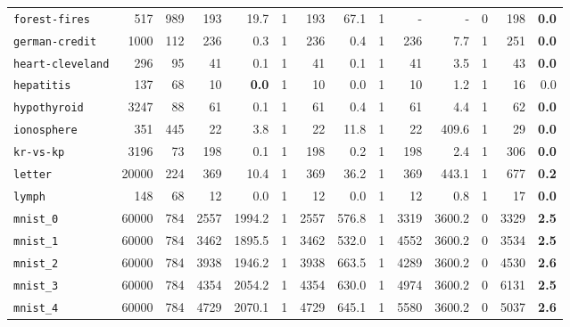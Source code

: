 \begin{tabular}{lccrrrrrrrrrrr}
\texttt{forest-fires} & \multicolumn{1}{r}{517} & \multicolumn{1}{r}{989}  & 193 & 19.7 & 1 & 193 & 67.1 & 1 & - & - & 0 & 198 & \textbf{0.0}\\
\texttt{german-credit} & \multicolumn{1}{r}{1000} & \multicolumn{1}{r}{112}  & 236 & 0.3 & 1 & 236 & 0.4 & 1 & 236 & 7.7 & 1 & 251 & \textbf{0.0}\\
\texttt{heart-cleveland} & \multicolumn{1}{r}{296} & \multicolumn{1}{r}{95}  & 41 & 0.1 & 1 & 41 & 0.1 & 1 & 41 & 3.5 & 1 & 43 & \textbf{0.0}\\
\texttt{hepatitis} & \multicolumn{1}{r}{137} & \multicolumn{1}{r}{68}  & 10 & \textbf{0.0} & 1 & 10 & 0.0 & 1 & 10 & 1.2 & 1 & 16 & 0.0\\
\texttt{hypothyroid} & \multicolumn{1}{r}{3247} & \multicolumn{1}{r}{88}  & 61 & 0.1 & 1 & 61 & 0.4 & 1 & 61 & 4.4 & 1 & 62 & \textbf{0.0}\\
\texttt{ionosphere} & \multicolumn{1}{r}{351} & \multicolumn{1}{r}{445}  & 22 & 3.8 & 1 & 22 & 11.8 & 1 & 22 & 409.6 & 1 & 29 & \textbf{0.0}\\
\texttt{kr-vs-kp} & \multicolumn{1}{r}{3196} & \multicolumn{1}{r}{73}  & 198 & 0.1 & 1 & 198 & 0.2 & 1 & 198 & 2.4 & 1 & 306 & \textbf{0.0}\\
\texttt{letter} & \multicolumn{1}{r}{20000} & \multicolumn{1}{r}{224}  & 369 & 10.4 & 1 & 369 & 36.2 & 1 & 369 & 443.1 & 1 & 677 & \textbf{0.2}\\
\texttt{lymph} & \multicolumn{1}{r}{148} & \multicolumn{1}{r}{68}  & 12 & 0.0 & 1 & 12 & 0.0 & 1 & 12 & 0.8 & 1 & 17 & \textbf{0.0}\\
\texttt{mnist\_0} & \multicolumn{1}{r}{60000} & \multicolumn{1}{r}{784}  & 2557 & 1994.2 & 1 & 2557 & 576.8 & 1 & 3319 & 3600.2 & 0 & 3329 & \textbf{2.5}\\
\texttt{mnist\_1} & \multicolumn{1}{r}{60000} & \multicolumn{1}{r}{784}  & 3462 & 1895.5 & 1 & 3462 & 532.0 & 1 & 4552 & 3600.2 & 0 & 3534 & \textbf{2.5}\\
\texttt{mnist\_2} & \multicolumn{1}{r}{60000} & \multicolumn{1}{r}{784}  & 3938 & 1946.2 & 1 & 3938 & 663.5 & 1 & 4289 & 3600.2 & 0 & 4530 & \textbf{2.6}\\
\texttt{mnist\_3} & \multicolumn{1}{r}{60000} & \multicolumn{1}{r}{784}  & 4354 & 2054.2 & 1 & 4354 & 630.0 & 1 & 4974 & 3600.2 & 0 & 6131 & \textbf{2.5}\\
\texttt{mnist\_4} & \multicolumn{1}{r}{60000} & \multicolumn{1}{r}{784}  & 4729 & 2070.1 & 1 & 4729 & 645.1 & 1 & 5580 & 3600.2 & 0 & 5037 & \textbf{2.6}\\

\end{tabular}

